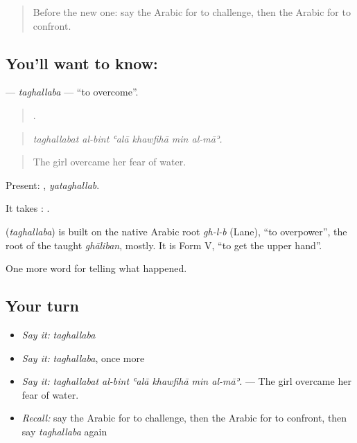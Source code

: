 \label{lesson:AR-C345-taghallaba}



\begin{quote}
Before the new one: say the Arabic for to challenge, then the Arabic for to confront.
\end{quote}

\subsection*{You'll want to know: }
\textbf{} — \emph{taghallaba} — \textquotedblleft{}to overcome\textquotedblright{}.

\begin{quote}
     .
\end{quote}

\begin{quote}
\emph{taghallabat al-bint ʿalā khawfihā min al-māʾ.}
\end{quote}

\begin{quote}
The girl overcame her fear of water.
\end{quote}

Present: , \emph{yataghallab}.

It takes :  .

\begin{cousinweb}
\textbf{} (\emph{taghallaba}) is built on the native Arabic root \emph{gh-l-b} (Lane), \textquotedblleft{}to overpower\textquotedblright{}, the root of the taught \emph{ghāliban}, mostly. It is Form V, \textquotedblleft{}to get the upper hand\textquotedblright{}.
\end{cousinweb}

\begin{grammarlens}[title={What you've built}]
One more word for telling what happened.
\end{grammarlens}

\subsection*{Your turn}
\begin{itemize}
\raggedright
  \item \emph{Say it:} \emph{taghallaba}
  \item \emph{Say it:} \emph{taghallaba}, once more
  \item \emph{Say it:} \emph{taghallabat al-bint ʿalā khawfihā min al-māʾ.} — The girl overcame her fear of water.
  \item \emph{Recall:} say the Arabic for to challenge, then the Arabic for to confront, then say \emph{taghallaba} again
\end{itemize}

